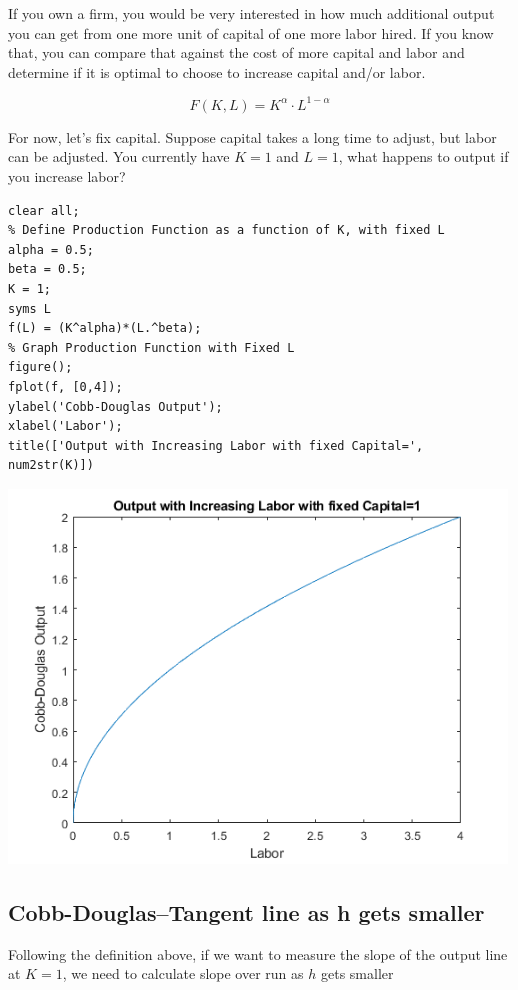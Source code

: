 \documentclass[
]{book}
\begin{document}
If you own a firm, you would be very interested in how much additional
output you can get from one more unit of capital of one more labor
hired. If you know that, you can compare that against the cost of more
capital and labor and determine if it is optimal to choose to increase
capital and/or labor.

\[F(K,L)=K^{\alpha } \cdot L^{1-\alpha }\]

For now, let's fix capital. Suppose capital takes a long time to adjust,
but labor can be adjusted. You currently have \(K=1\) and \(L=1\), what
happens to output if you increase labor?

\begin{verbatim}
clear all;
% Define Production Function as a function of K, with fixed L
alpha = 0.5;
beta = 0.5;
K = 1;
syms L
f(L) = (K^alpha)*(L.^beta);
% Graph Production Function with Fixed L
figure();
fplot(f, [0,4]);
ylabel('Cobb-Douglas Output');
xlabel('Labor');
title(['Output with Increasing Labor with fixed Capital=', num2str(K)])
\end{verbatim}

\includegraphics[width=5.20833in,height=\textheight]{img/derivative_hslope_cobb_douglas_images/figure_0.png}

\hypertarget{cobb-douglastangent-line-as-h-gets-smaller}{%
\subsection{Cobb-Douglas--Tangent line as h gets smaller}\label{cobb-douglastangent-line-as-h-gets-smaller}}

Following the definition above, if we want to measure the slope of the
output line at \(K=1\), we need to calculate slope over run as \(h\) gets
smaller
\end{document}
